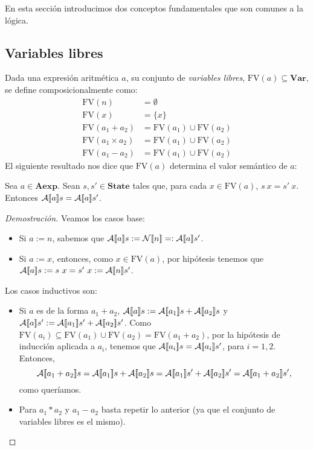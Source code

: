 En esta sección introducimos dos conceptos fundamentales que son comunes a la lógica.

\subsection{Variables libres}

Dada una expresión aritmética $a$, su conjunto de \textit{variables libres}, $\mathrm{FV}(a) \subseteq \mathbf{Var}$, se define composicionalmente como:
\begin{align*}
    \mathrm{FV}(n) & = \emptyset\\
    \mathrm{FV}(x) & = \{x\}\\
    \mathrm{FV}(a_1 + a_2) & = \mathrm{FV}(a_1) \cup \mathrm{FV}(a_2) \\
    \mathrm{FV}(a_1 \times a_2) & = \mathrm{FV}(a_1) \cup \mathrm{FV}(a_2) \\
    \mathrm{FV}(a_1 - a_2) & = \mathrm{FV}(a_1) \cup \mathrm{FV}(a_2) 
\end{align*}
El siguiente resultado nos dice que $\mathrm{FV}(a)$ determina el valor semántico de $a$:

\begin{lema}
Sea $a\in \mathbf{Aexp}$. Sean $s, s' \in \mathbf{State}$ tales que, para cada $x \in \mathrm{FV}(a)$, $s\ x = s'\ x$. Entonces $\mathcal{A}[\![a]\!]s = \mathcal{A}[\![a]\!]s'$.
\end{lema}
\begin{proof}[Demostración]
Veamos los casos base:
\begin{itemize}
    \item Si $a:= n$, sabemos que $\mathcal{A}[\![a]\!]s := \mathcal{N}[\![n]\!] =: \mathcal{A}[\![a]\!]s'$.
    \item Si $a := x$, entonces, como $x \in \mathrm{FV}(a)$, por hipótesis tenemos que $\fc{A}{a}s := s\ x  = s'\ x := \fc{A}{n}s'$.
\end{itemize}
Los casos inductivos son:
\begin{itemize}
    \item Si $a$ es de la forma $a_1 + a_2$, $\mathcal{A}[\![a]\!]s := \mathcal{A}[\![a_1]\!]s + \mathcal{A}[\![a_2]\!]s$ y $\mathcal{A}[\![a]\!]s' := \mathcal{A}[\![a_1]\!]s' + \mathcal{A}[\![a_2]\!]s'$. Como $\mathrm{FV}(a_i) \subseteq \mathrm{FV}(a_1) \cup\mathrm{FV}(a_2) = \mathrm{FV}(a_1 + a_2)$, por la hipótesis de inducción aplicada a $a_i$, tenemos que $\mathcal{A}[\![a_i]\!]s = \mathcal{A}[\![a_i]\!]s'$, para $i = 1, 2$. Entonces,
$$\fc{A}{a_1+a_2}s = \fc{A}{a_1}s + \fc{A}{a_2}s = \fc{A}{a_1}s' + \fc{A}{a_2}s' = \fc{A}{a_1+a_2}s',$$
como queríamos. 
    \item Para $a_1 * a_2$ y $a_1 - a_2$ basta repetir lo anterior (ya que el conjunto de variables libres es el mismo).
\end{itemize}
\end{proof}

